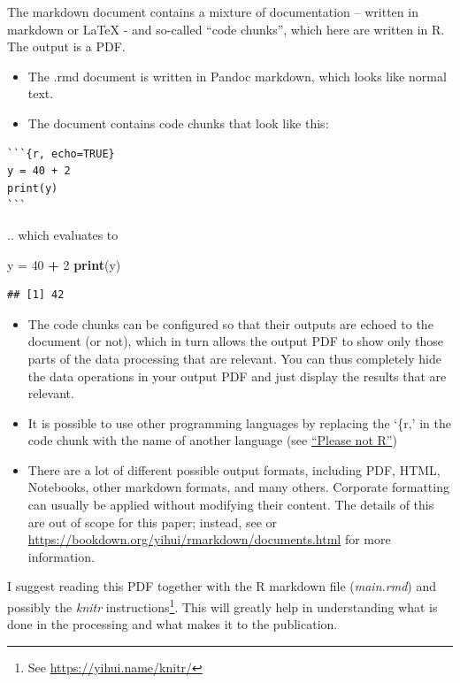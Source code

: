 \documentclass[11pt,]{article}
\newenvironment{Shaded}{\begin{snugshade}}{\end{snugshade}}
\newcommand{\DecValTok}[1]{\textcolor[rgb]{0.00,0.00,0.81}{#1}}
\newcommand{\KeywordTok}[1]{\textcolor[rgb]{0.13,0.29,0.53}{\textbf{#1}}}
\newcommand{\NormalTok}[1]{#1}
\newcommand{\OperatorTok}[1]{\textcolor[rgb]{0.81,0.36,0.00}{\textbf{#1}}}
\newcommand{\StringTok}[1]{\textcolor[rgb]{0.31,0.60,0.02}{#1}}
\providecommand{\tightlist}{%
  \setlength{\itemsep}{0pt}\setlength{\parskip}{0pt}}
\let\rmarkdownfootnote\footnote%
\def\footnote{\protect\rmarkdownfootnote}
\begin{document}
The markdown document contains a mixture of documentation -- written in markdown or LaTeX - and so-called ``code chunks'', which here are written in R. The output is a PDF.

\begin{itemize}
\tightlist
\item
  The .rmd document is written in Pandoc markdown, which looks like normal text.
\item
  The document contains code chunks that look like this:
\end{itemize}

\begin{verbatim}
```{r, echo=TRUE}
y = 40 + 2
print(y)
```
\end{verbatim}

.. which evaluates to

\begin{Shaded}
\begin{Highlighting}[]
\NormalTok{y =}\StringTok{ }\DecValTok{40} \OperatorTok{+}\StringTok{ }\DecValTok{2}
\KeywordTok{print}\NormalTok{(y)}
\end{Highlighting}
\end{Shaded}

\begin{verbatim}
## [1] 42
\end{verbatim}

\begin{itemize}
\tightlist
\item
  The code chunks can be configured so that their outputs are echoed to the document (or not), which in turn allows the output PDF to show only those parts of the data processing that are relevant. You can thus completely hide the data operations in your output PDF and just display the results that are relevant.
\item
  It is possible to use other programming languages by replacing the `\{r,' in the code chunk with the name of another language (see \protect\hyperlink{pleaseNotR}{``Please not R''})
\item
  There are a lot of different possible output formats, including PDF, HTML, Notebooks, other markdown formats, and many others. Corporate formatting can usually be applied without modifying their content. The details of this are out of scope for this paper; instead, see \citep{R-Markdown-Guide} or \url{https://bookdown.org/yihui/rmarkdown/documents.html} for more information.
\end{itemize}

I suggest reading this PDF together with the R markdown file (\emph{main.rmd}) and possibly the \emph{knitr} instructions\footnote{See \url{https://yihui.name/knitr/}}. This will greatly help in understanding what is done in the processing and what makes it to the publication.
\end{document}
